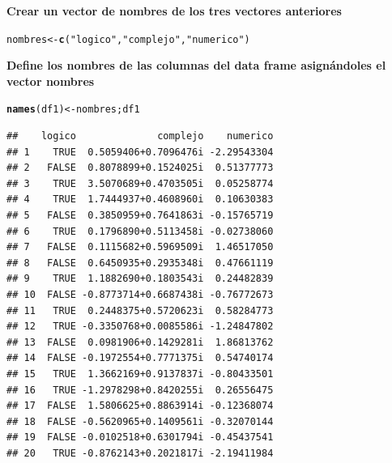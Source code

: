 \documentclass[12pt,letterpaper]{article}\usepackage[]{graphicx}\usepackage[]{color}
\makeatletter
\newcommand{\hlstr}[1]{\textcolor[rgb]{0.192,0.494,0.8}{#1}}%
\newcommand{\hlstd}[1]{\textcolor[rgb]{0.345,0.345,0.345}{#1}}%
\newcommand{\hlkwb}[1]{\textcolor[rgb]{0.69,0.353,0.396}{#1}}%
\newcommand{\hlkwd}[1]{\textcolor[rgb]{0.737,0.353,0.396}{\textbf{#1}}}%
\newenvironment{kframe}{%
 \def\at@end@of@kframe{}%
 \ifinner\ifhmode%
  \def\at@end@of@kframe{\end{minipage}}%
  \begin{minipage}{\columnwidth}%
 \fi\fi%
 \def\FrameCommand##1{\hskip\@totalleftmargin \hskip-\fboxsep
 \colorbox{shadecolor}{##1}\hskip-\fboxsep
     \hskip-\linewidth \hskip-\@totalleftmargin \hskip\columnwidth}%
 \MakeFramed {\advance\hsize-\width
   \@totalleftmargin\z@ \linewidth\hsize
   \@setminipage}}%
 {\par\unskip\endMakeFramed%
 \at@end@of@kframe}
\newenvironment{knitrout}{}{} %
\makeatother
\begin{document}
\textbf{Crear un vector de nombres de los tres vectores anteriores}
\begin{knitrout}
\color{fgcolor}\begin{kframe}
\begin{alltt}
\hlstd{nombres} \hlkwb{<-} \hlkwd{c}\hlstd{(}\hlstr{"logico"}\hlstd{,} \hlstr{"complejo"}\hlstd{,} \hlstr{"numerico"}\hlstd{)}
\end{alltt}
\end{kframe}
\end{knitrout}

\textbf{Define los nombres de las columnas del data frame asign\'andoles el vector nombres}
\begin{knitrout}
\color{fgcolor}\begin{kframe}
\begin{alltt}
\hlkwd{names}\hlstd{(df1)} \hlkwb{<-} \hlstd{nombres; df1}
\end{alltt}
\begin{verbatim}
##    logico              complejo    numerico
## 1    TRUE  0.5059406+0.7096476i -2.29543304
## 2   FALSE  0.8078899+0.1524025i  0.51377773
## 3    TRUE  3.5070689+0.4703505i  0.05258774
## 4    TRUE  1.7444937+0.4608960i  0.10630383
## 5   FALSE  0.3850959+0.7641863i -0.15765719
## 6    TRUE  0.1796890+0.5113458i -0.02738060
## 7   FALSE  0.1115682+0.5969509i  1.46517050
## 8   FALSE  0.6450935+0.2935348i  0.47661119
## 9    TRUE  1.1882690+0.1803543i  0.24482839
## 10  FALSE -0.8773714+0.6687438i -0.76772673
## 11   TRUE  0.2448375+0.5720623i  0.58284773
## 12   TRUE -0.3350768+0.0085586i -1.24847802
## 13  FALSE  0.0981906+0.1429281i  1.86813762
## 14  FALSE -0.1972554+0.7771375i  0.54740174
## 15   TRUE  1.3662169+0.9137837i -0.80433501
## 16   TRUE -1.2978298+0.8420255i  0.26556475
## 17  FALSE  1.5806625+0.8863914i -0.12368074
## 18  FALSE -0.5620965+0.1409561i -0.32070144
## 19  FALSE -0.0102518+0.6301794i -0.45437541
## 20   TRUE -0.8762143+0.2021817i -2.19411984
\end{verbatim}
\end{kframe}
\end{knitrout}
\end{document}
